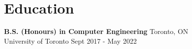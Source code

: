 \section{Education}
\resumeSubHeadingListStart
    \item
        \textbf{B.S. (Honours) in Computer Engineering} \hfill \textcolor{primaryColor}{Toronto, ON} \\
        University of Toronto \hfill \textcolor{secondaryColor}{Sept 2017 - May 2022}
    \resumeItemListStart
    \resumeItemListEnd
\resumeSubHeadingListEnd 